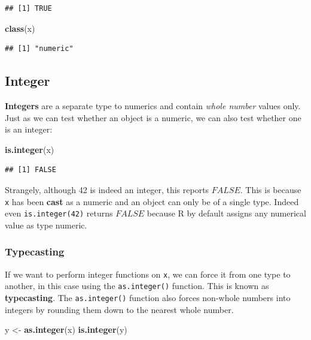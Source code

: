 \documentclass[a4paper]{book}
\newenvironment{Shaded}{\begin{snugshade}}{\end{snugshade}}
\newcommand{\KeywordTok}[1]{\textcolor[rgb]{0.13,0.29,0.53}{\textbf{{#1}}}}
\newcommand{\StringTok}[1]{\textcolor[rgb]{0.31,0.60,0.02}{{#1}}}
\newcommand{\NormalTok}[1]{{#1}}
\renewenvironment{Shaded}
{\vspace{1.5em}\begin{leftbar}\begin{snugshade}}
{\end{snugshade}\end{leftbar}\vspace{3pt}}
\begin{document}
\begin{verbatim}
## [1] TRUE
\end{verbatim}

\begin{Shaded}
\begin{Highlighting}[]
\KeywordTok{class}\NormalTok{(x)}
\end{Highlighting}
\end{Shaded}

\begin{verbatim}
## [1] "numeric"
\end{verbatim}

\subsection{Integer}\label{integer}

\textbf{Integers} are a separate type to numerics and contain
\emph{whole number} values only. Just as we can test whether an object
is a numeric, we can also test whether one is an integer:

\begin{Shaded}
\begin{Highlighting}[]
\KeywordTok{is.integer}\NormalTok{(x)}
\end{Highlighting}
\end{Shaded}

\begin{verbatim}
## [1] FALSE
\end{verbatim}

Strangely, although 42 is indeed an integer, this reports \(FALSE\).
This is because \texttt{x} has been \textbf{cast} as a numeric and an
object can only be of a single type. Indeed even \texttt{is.integer(42)}
returns \(FALSE\) because R by default assigns any numerical value as
type numeric.

\subsubsection{Typecasting}\label{typecasting}

If we want to perform integer functions on \texttt{x}, we can force it
from one type to another, in this case using the \texttt{as.integer()}
function. This is known as \textbf{typecasting}. The
\texttt{as.integer()} function also forces non-whole numbers into
integers by rounding them down to the nearest whole number.

\begin{Shaded}
\begin{Highlighting}[]
\NormalTok{y <-}\StringTok{ }\KeywordTok{as.integer}\NormalTok{(x)}
\KeywordTok{is.integer}\NormalTok{(y)}
\end{Highlighting}
\end{Shaded}
\end{document}
